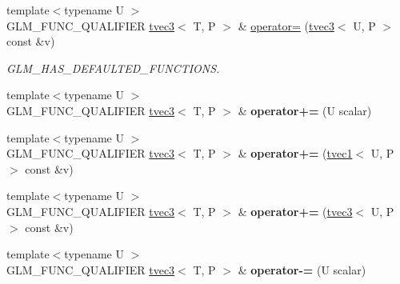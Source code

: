 \begin{DoxyCompactItemize}
\item 
\mbox{\label{structglm_1_1tvec3_a4bcbc0805df40364733e741a859a6989}} 
{\footnotesize template$<$typename U $>$ }\\G\+L\+M\+\_\+\+F\+U\+N\+C\+\_\+\+Q\+U\+A\+L\+I\+F\+I\+ER \hyperlink{structglm_1_1tvec3}{tvec3}$<$ T, P $>$ \& \hyperlink{structglm_1_1tvec3_a4bcbc0805df40364733e741a859a6989}{operator=} (\hyperlink{structglm_1_1tvec3}{tvec3}$<$ U, P $>$ const \&v)
\begin{DoxyCompactList}\small\item\em G\+L\+M\+\_\+\+H\+A\+S\+\_\+\+D\+E\+F\+A\+U\+L\+T\+E\+D\+\_\+\+F\+U\+N\+C\+T\+I\+O\+NS. \end{DoxyCompactList}\item 
\mbox{\label{structglm_1_1tvec3_a447912153d202969d9f5103af75d581d}} 
{\footnotesize template$<$typename U $>$ }\\G\+L\+M\+\_\+\+F\+U\+N\+C\+\_\+\+Q\+U\+A\+L\+I\+F\+I\+ER \hyperlink{structglm_1_1tvec3}{tvec3}$<$ T, P $>$ \& {\bfseries operator+=} (U scalar)
\item 
\mbox{\label{structglm_1_1tvec3_a26a3f96b23e7f5d59992c65a48dbb01d}} 
{\footnotesize template$<$typename U $>$ }\\G\+L\+M\+\_\+\+F\+U\+N\+C\+\_\+\+Q\+U\+A\+L\+I\+F\+I\+ER \hyperlink{structglm_1_1tvec3}{tvec3}$<$ T, P $>$ \& {\bfseries operator+=} (\hyperlink{structglm_1_1tvec1}{tvec1}$<$ U, P $>$ const \&v)
\item 
\mbox{\label{structglm_1_1tvec3_a8c4047ef94643db0f346827041366fd2}} 
{\footnotesize template$<$typename U $>$ }\\G\+L\+M\+\_\+\+F\+U\+N\+C\+\_\+\+Q\+U\+A\+L\+I\+F\+I\+ER \hyperlink{structglm_1_1tvec3}{tvec3}$<$ T, P $>$ \& {\bfseries operator+=} (\hyperlink{structglm_1_1tvec3}{tvec3}$<$ U, P $>$ const \&v)
\item 
\mbox{\label{structglm_1_1tvec3_aa8e58a178c28d5e2283600de3cfed096}} 
{\footnotesize template$<$typename U $>$ }\\G\+L\+M\+\_\+\+F\+U\+N\+C\+\_\+\+Q\+U\+A\+L\+I\+F\+I\+ER \hyperlink{structglm_1_1tvec3}{tvec3}$<$ T, P $>$ \& {\bfseries operator-\/=} (U scalar)
\item 
\mbox{\label{structglm_1_1tvec3_a5faeb262b3d7bdc7c56fbb582ef6ee5a}} 

\end{DoxyCompactItemize}
